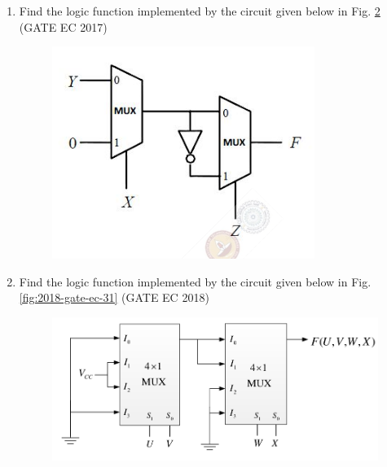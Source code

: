 \begin{enumerate}
\begin{figure}[H]
	\caption{}
\label{fig:2016/gate/in/19}
\end{figure}


\item 
\label{prob:2017-gate-ec-16}
Find the logic function implemented by the circuit given below 
in Fig.
\ref{fig:2017-gate-ec-16}
\hfill (GATE EC 2017)
\begin{figure}[H]
\centering
	\includegraphics[width=\columnwidth]{figs/2017-gate-ec-16.png}
\caption{}
\label{fig:2017-gate-ec-16}
\end{figure}
\item 
\label{prob:2018-gate-ec-31}
Find the logic function implemented by the circuit given below 
in Fig.
\ref{fig:2018-gate-ec-31}
\hfill (GATE EC 2018)
\begin{figure}[H]
\centering
	\includegraphics[width=\columnwidth]{figs/2018-gate-ec-31.png}

\end{figure}
\end{enumerate}
